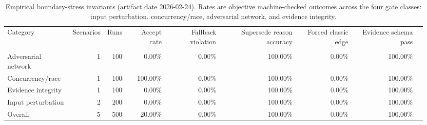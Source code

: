 \begin{table}[!tp]
\centering
\scriptsize
\caption{Empirical boundary-stress invariants (artifact date 2026-02-24). Rates are objective machine-checked outcomes across the four gate classes: input perturbation, concurrency/race, adversarial network, and evidence integrity.}
\label{tab:supp-boundary-stress-empirical}
\begin{tabular}{@{}lrrrrrrrr@{}}
\toprule
Category & Scenarios & Runs & Accept rate & Fallback violation & Supersede reason accuracy & Forced classic edge & Evidence schema pass \\\\
\midrule
Adversarial network & 1 & 100 & 0.00\% & 0.00\% & 100.00\% & 0.00\% & 100.00\% \\
Concurrency/race & 1 & 100 & 100.00\% & 0.00\% & 100.00\% & 0.00\% & 100.00\% \\
Evidence integrity & 1 & 100 & 0.00\% & 0.00\% & 100.00\% & 0.00\% & 100.00\% \\
Input perturbation & 2 & 200 & 0.00\% & 0.00\% & 100.00\% & 0.00\% & 100.00\% \\
Overall & 5 & 500 & 20.00\% & 0.00\% & 100.00\% & 0.00\% & 100.00\% \\
\bottomrule
\end{tabular}
\end{table}
